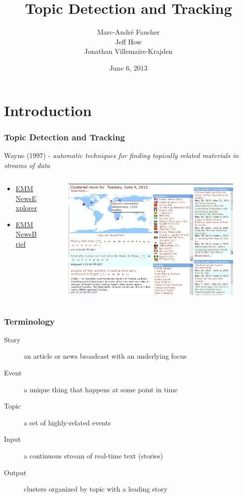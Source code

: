 \documentclass{beamer}
\title{Topic Detection and Tracking}
\author{
	Marc-André Faucher\\
	Jeff How\\
        Jonathan Villemaire-Krajden}
\date{June 6, 2013}
\begin{document}
\begin{frame}[plain]
  \titlepage
\end{frame}

\section{Introduction}

\begin{frame}
  \frametitle{Topic Detection and Tracking}
  Wayne (1997) - \textit{automatic techniques for finding topically related materials in streams of data}
\begin{columns}
\begin{column}{.28\textwidth}
  \begin{itemize}
  \item
    \href{http://emm.newsexplorer.eu/NewsExplorer/home/en/latest.html}{EMM NewsExplorer}
  \item
    \href{http://emm.newsbrief.eu/NewsBrief/clusteredition/en/latest.html}{EMM NewsBrief}
  \end{itemize}
\end{column}
\begin{column}{.68\textwidth}
  \begin{figure}[h]
    \centering
    \includegraphics[width=\textwidth]{images/emm_0}
  \end{figure}
\end{column}
\end{columns}
\end{frame}

\begin{frame}
  \frametitle{Terminology}
  \begin{description}
  \item[Story] an article or news broadcast with an underlying focus
  \item[Event] a unique thing that happens at some point in time
  \item[Topic] a set of highly-related events
  \ \\
  \item[Input] a continuous stream of real-time text (stories)
  \item[Output] clusters organized by topic with a leading story
  \end{description}
\end{frame}
\end{document}
